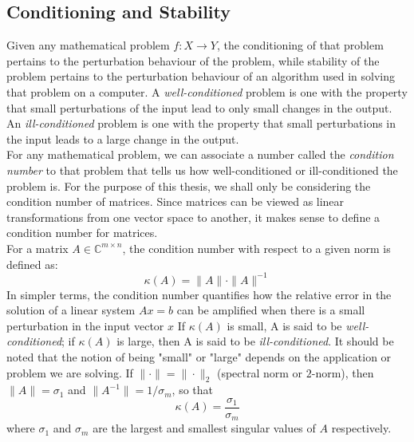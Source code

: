 \subsection{Conditioning and Stability}
Given any mathematical problem $f: X \rightarrow Y$, the conditioning of that problem pertains to the perturbation behaviour of the problem, while stability of the problem pertains to the perturbation behaviour of an algorithm used in solving that problem on a computer. A \textit{well-conditioned} problem is one with the property that small perturbations of the input lead to only small changes in the output. An \textit{ill-conditioned} problem is one with the property that small perturbations in the input leads to a large change in the output.\\
For any mathematical problem, we can associate a number called the \textit{condition number} to that problem that tells us how well-conditioned or ill-conditioned the problem is. For the purpose of this thesis, we shall only be considering the condition number of matrices. Since matrices can be viewed as linear transformations from one vector space to another, it makes sense to define a condition number for matrices.\\
For a matrix $A \in \mathbb{C}^{m\times n}$, the condition number with respect to a given norm is defined as:
\begin{equation}
	\kappa(A) = \|A\| \cdot \|A\|^{-1}
\end{equation}
In simpler terms, the condition number quantifies how the relative error in the solution of a linear system $Ax = b$ can be amplified when there is a small perturbation in the input vector $x$ If $\kappa(A)$ is small, A is said to be \textit{well-conditioned}; if $\kappa(A)$ is large, then A is said to be \textit{ill-conditioned}. It should be noted that the notion of being "small" or "large" depends on the application or problem we are solving. If $\| \cdot\| = \| \cdot \|_2$ (spectral norm or $2$-norm), then $\|A\| = \sigma_1$ and $\| A^{-1} \| = 1/\sigma_m$, so that
\begin{equation}
	\kappa(A) = \frac{\sigma_1}{\sigma_m}
\end{equation}
where $\sigma_1$ and $\sigma_m$ are the largest and smallest singular values of $A$ respectively.
